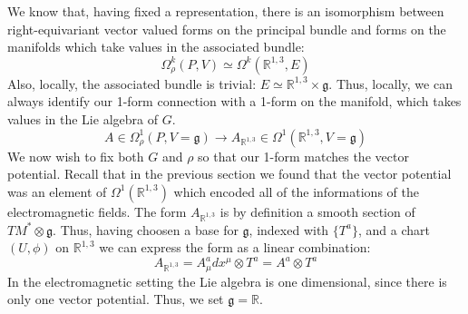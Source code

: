\documentclass[12pt,a4paper]{report}
\theoremstyle{definition}
\theoremstyle{Theorem}
\theoremstyle{definition}
\theoremstyle{definition}
\begin{document}
	We know that, having fixed a representation, there is an isomorphism between right-equivariant vector valued forms on the principal bundle and forms on the manifolds which take values in the associated bundle:
	$$\Omega_\rho^k(P,V)\simeq \Omega^k(\mathbb{R}^{1,3},E)$$
	Also, locally, the associated bundle is trivial: $E\simeq \mathbb{R}^{1,3}\times \mathfrak{g}$. Thus, locally, we can always identify our 1-form connection with a 1-form on the manifold, which takes values in the Lie algebra of $G$. 
	$$A\in \Omega_\rho^1(P,V=\mathfrak{g})\longrightarrow A_{\mathbb{R}^{1,3}}\in\Omega^1(\mathbb{R}^{1,3},V=\mathfrak{g})$$
	We now wish to fix both $G$ and $\rho$ so that our 1-form matches the vector potential. Recall that in the previous section we found that the vector potential was an element of $\Omega^1(\mathbb{R}^{1,3})$ which encoded all of the informations of the electromagnetic fields. The form $A_{\mathbb{R}^{1,3}}$ is by definition a smooth section of $TM^*\otimes \mathfrak{g}$. Thus, having choosen a base for $\mathfrak{g}$, indexed with $\{T^a\}$, and a chart $(U,\phi)$ on $\mathbb{R}^{1,3}$ we can express the form as a linear combination:
	$$A_{\mathbb{R}^{1,3}}=A^a_\mu dx^\mu\otimes T^a=A^a\otimes T^a$$
	In the electromagnetic setting the Lie algebra is one dimensional, since there is only one vector potential. Thus, we set $\mathfrak{g}=\mathbb{R}$.
	\begin{comment}
		We have said that the vector potential has a symmetry, which from now on will be called gauge symmetry, like:
		$$A\sim A+da$$
		where $a$ is a generic smooth function on the manifold.\\
		\\
		We now wish to construct a Lagrangian describing the electromagnetic field. A priori, we impose the existence of a principal $G$-bundle $(P,\mathbb{R}^{1,3},\pi,G)$ where $G$ is a Lie group.
		It is known that, given a principal bundle  and a finite dimensional representation $\rho:G\rightarrow GL(V)$, we can construct an associated bundle $({P\times V\over \sim},\mathbb{R}^{1,3},\pi_A,G)$ with the equivalence relation:
		$$(p,v)\sim(p\cdot g,\rho(g^{-1})v)$$
		where $g\in G$ and $p\in P$. It was shown in theorem REFERENZA TEOREMA that the exists a 1-1 correspondence of the form:
		$$\Omega^k(P,V)\simeq \Omega^k(\mathbb{R}^{1,3},{P\times V\over \sim})$$
		Moreover, locally, the associated bundle is trivial: ${P\times V\over \sim}\simeq M\times V$. In our setting, the form $A$ belongs to the space $\Omega^1(\mathbb{R}^{1,3})=\Omega^1(\mathbb{R}^{1,3},\mathbb{R})$, so it is a real valued $1$-form on the manifold. Clearly, this form can also be seen as an element of the space $\Omega^1(\mathbb{R}^{1,3},\mathbb{R}^{1,3}\times \mathbb{R})$. Thus, considering $V=\mathbb{R}$ as our vector space, locally, our form is an element of $\Omega^1(\mathbb{R}^{1,3},{P\times \mathbb{R}\over \sim})$. Thus, there exists a corresponding form inside $\Omega^1(P,\mathbb{R})$. Now, to completely fix the principal bundle, we just need specify a representation.
	\end{comment}
	
\end{document}
